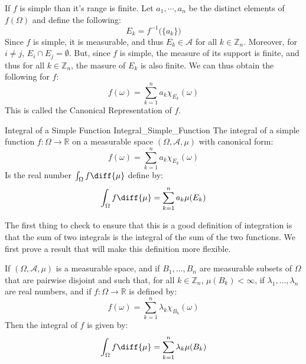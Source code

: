     If $f$ is simple than it's range is finite. Let
    $a_{1},\cdots,a_{n}$ be the distinct elements of
    $f(\Omega)$ and define the following:
    \begin{equation}
        E_{k}=f^{-1}\big(\{a_{k}\}\big)
    \end{equation}
    Since $f$ is simple, it is measurable, and thus
    $E_{k}\in\mathcal{A}$ for all $k\in\mathbb{Z}_{n}$.
    Moreover, for $i\ne{j}$,
    $E_{i}\cap{E}_{j}=\emptyset$. But, since $f$ is
    simple, the measure of its support is finite, and
    thus for all $k\in\mathbb{Z}_{n}$,
    the masure of $E_{k}$ is also finite.
    We can thus obtain the following for $f$:
    \begin{equation}
        f(\omega)=
            \sum_{k=1}^{n}a_{k}\chi_{E_{k}}(\omega)
    \end{equation}
    This is called the \textrm{Canonical Representation}
    of $f$.
    \begin{ldefinition}{Integral of a Simple Function}
          {Integral_Simple_Function}
        The integral of a simple function
        $f:\Omega\rightarrow\mathbb{R}$ on a measurable
        space $(\Omega,\mathcal{A},\mu)$ with canonical
        form:
        \begin{equation}
            f(\omega)=\sum_{k=1}^{n}
                a_{k}\chi_{E_{k}}(\omega)
        \end{equation}
        Is the real number $\int_{\Omega}f\diff{\mu}$
        define by:
        \begin{equation}
            \int_{\Omega}f\diff{\mu}=
                \sum_{k=1}^{n}a_{k}\mu(E_{k})
        \end{equation}
    \end{ldefinition}
    The first thing to check to ensure that this is
    a good definition of integration is that the
    sum of two integrals is the integral of the sum
    of the two functions. We first prove a result that
    will make this definition more flexible.
    \begin{theorem}
        If $(\Omega,\mathcal{A},\mu)$ is a measurable
        space, and if $B_{1},\dots,B_{n}$ are measurable
        subsets of $\Omega$ that are pairwise disjoint
        and such that, for all $k\in\mathbb{Z}_{n}$,
        $\mu(B_{k})<\infty$, if
        $\lambda_{1},\dots,\lambda_{n}$ are real
        numbers, and if $f:\Omega\rightarrow\mathbb{R}$
        is defined by:
        \begin{equation}
            f(\omega)=\sum_{k=1}^{n}
                \lambda_{k}\chi_{B_{k}}(\omega)
        \end{equation}
        Then the integral of $f$ is given by:
        \begin{equation}
            \int_{\Omega}f\diff{\mu}
                =\sum_{k=1}^{n}\lambda_{k}
                \mu(B_{k})
        \end{equation}
    \end{theorem}
